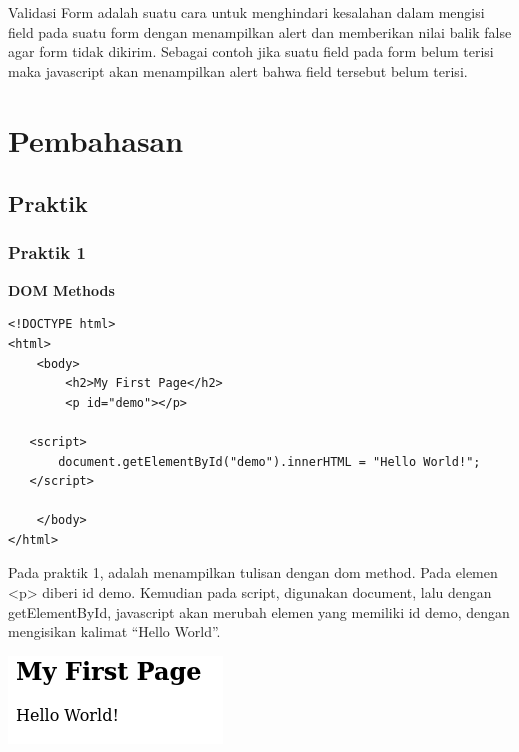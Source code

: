 \documentclass[a4paper,12pt]{article}
\begin{document}
Validasi Form adalah suatu cara untuk menghindari kesalahan dalam mengisi field pada suatu form dengan menampilkan alert
dan memberikan nilai balik false agar form tidak dikirim. Sebagai contoh jika suatu field pada form belum terisi maka
javascript akan menampilkan alert bahwa field tersebut belum terisi.

\newpage

\section{Pembahasan}
\subsection{Praktik}
\subsubsection{Praktik 1}
\textbf{DOM Methods\\}
\begin{lstlisting}[style=htmlcssjs]
<!DOCTYPE html>
<html>
    <body>
        <h2>My First Page</h2>
        <p id="demo"></p>

   <script>
       document.getElementById("demo").innerHTML = "Hello World!";
   </script>

    </body>
</html>
\end{lstlisting}
Pada praktik 1, adalah menampilkan tulisan dengan dom method. Pada elemen <p> diberi id demo. Kemudian pada script,
digunakan document, lalu dengan getElementById, javascript akan merubah elemen yang memiliki id demo, dengan mengisikan
kalimat ``Hello World''.
\begin{center}
    \includegraphics[scale=.7]{1.png} 
\end{center}
\end{document}
